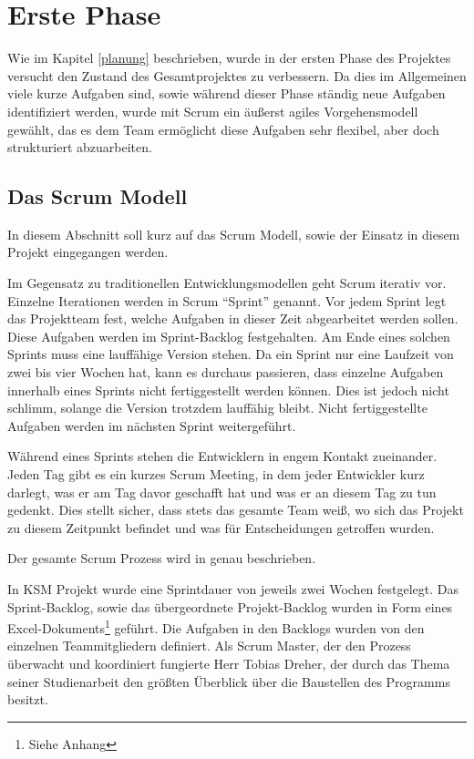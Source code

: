 \section{Erste Phase}

Wie im Kapitel \ref{planung} beschrieben, wurde in der ersten Phase des Projektes versucht den Zustand des Gesamtprojektes zu verbessern. Da dies im Allgemeinen viele kurze Aufgaben sind, sowie während dieser Phase ständig neue Aufgaben identifiziert werden, wurde mit Scrum ein äußerst agiles Vorgehensmodell gewählt, das es dem Team ermöglicht diese Aufgaben sehr flexibel, aber doch strukturiert abzuarbeiten.

\subsection{Das Scrum Modell}

In diesem Abschnitt soll kurz auf das Scrum Modell, sowie der Einsatz in diesem Projekt eingegangen werden.

Im Gegensatz zu traditionellen Entwicklungsmodellen geht Scrum iterativ vor. Einzelne Iterationen werden in Scrum ``Sprint'' genannt. Vor jedem Sprint legt das Projektteam fest, welche Aufgaben in dieser Zeit abgearbeitet werden sollen. Diese Aufgaben werden im Sprint-Backlog festgehalten. Am Ende eines solchen Sprints muss eine lauffähige Version stehen. Da ein Sprint nur eine Laufzeit von zwei bis vier Wochen hat, kann es durchaus passieren, dass einzelne Aufgaben innerhalb eines Sprints nicht fertiggestellt werden können. Dies ist jedoch nicht schlimm, solange die Version trotzdem lauffähig bleibt. Nicht fertiggestellte Aufgaben werden im nächsten Sprint  weitergeführt. 

Während eines Sprints stehen die Entwicklern in engem Kontakt zueinander. Jeden Tag gibt es ein kurzes Scrum Meeting, in dem jeder Entwickler kurz darlegt, was er am Tag davor geschafft hat und was er an diesem Tag zu tun gedenkt. Dies stellt sicher, dass stets das gesamte Team weiß, wo sich das Projekt zu diesem Zeitpunkt befindet und was für Entscheidungen getroffen wurden. 

Der gesamte Scrum Prozess wird in \cite{bib:agil} genau beschrieben.

In KSM Projekt wurde eine Sprintdauer von jeweils zwei Wochen festgelegt. Das Sprint-Backlog, sowie das übergeordnete Projekt-Backlog wurden in Form eines Excel-Dokuments\footnote{Siehe Anhang} geführt. Die Aufgaben in den Backlogs wurden von den einzelnen Teammitgliedern definiert. Als Scrum Master, der den Prozess überwacht und koordiniert fungierte Herr Tobias Dreher, der durch das Thema seiner Studienarbeit den größten Überblick über die Baustellen des Programms besitzt.

